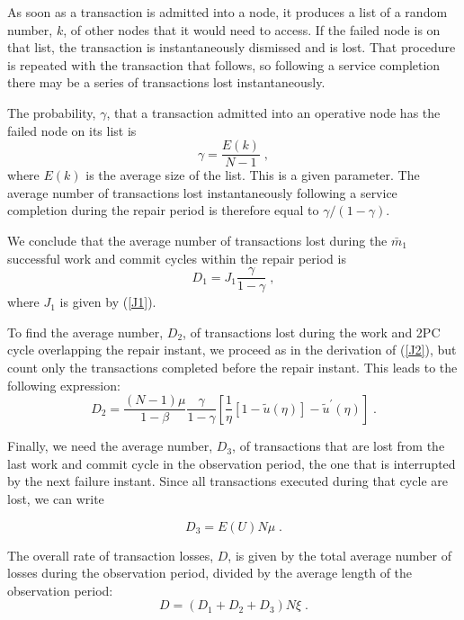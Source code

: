 As soon as a transaction is admitted into a node, it produces a list of a random number,
$k$, of other nodes that it would need to access. If the failed node is on that
list, the transaction is instantaneously dismissed and is lost. That procedure is repeated
with the transaction that follows, so following a service completion there may be a series
of transactions lost instantaneously.

The probability, $\gamma$, that a transaction admitted into an operative node has the
failed node on its list is
\begin{equation}   \label{E(k)}
\gamma = \frac{E(k)}{N-1}\;,
\end{equation}
where $E(k)$ is the average size of the list. This is a given parameter. The
average number of transactions lost instantaneously following a service completion
during the repair period is therefore equal to $\gamma /(1-\gamma )$.

We conclude that the average number of transactions lost during the $\bar{m}_1$
successful work and commit cycles within the repair period is
\begin{equation}
D_1 = J_1 \frac{\gamma}{1-\gamma}\;,
\end{equation}
where $J_1$ is given by (\ref{J1}).

To find the average number, $D_2$, of transactions lost during the work and 2PC cycle
overlapping the repair instant, we proceed as in the derivation of (\ref{J2}),
but count only the transactions completed before the repair instant.
This leads to the following expression:
\begin{equation}
D_2 = \frac{(N-1)\mu}{1-\beta}\frac{\gamma}{1-\gamma}
\left [ \frac{1}{\eta} [1-\tilde{u}(\eta)] - \tilde{u}^\prime(\eta) \right ]\;.
\end{equation}

Finally, we need the average number, $D_3$, of transactions that are lost from the
last work and commit cycle in the observation period, the one that is interrupted by
the next failure instant. Since all transactions executed during that cycle are lost,
we can write

\begin{equation}
D_3 = E(U) N\mu\;.
\end{equation}

The overall rate of transaction losses, $D$, is given by the total average number of
losses during the observation period, divided by the average length of the
observation period:
\begin{equation}
D = (D_1+D_2+D_3)N\xi\;.
\end{equation}

